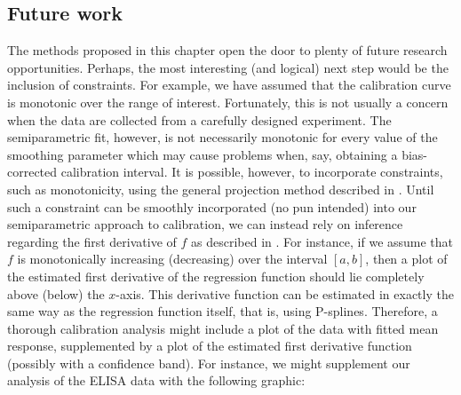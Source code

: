 \documentclass[cmfont,usenames,dvipsnames,leqno]{afit-etd}\usepackage[]{graphicx}\usepackage[]{color}
\begin{document}
\subsection{Future work}
The methods proposed in this chapter open the door to plenty of future research opportunities. Perhaps, the most interesting (and logical) next step would be the inclusion of constraints. For example, we have assumed that the calibration curve is monotonic over the range of interest. Fortunately, this is not usually a concern when the data are collected from a carefully designed experiment. The semiparametric fit, however, is not necessarily monotonic for every value of the smoothing parameter which may cause problems when, say, obtaining a bias-corrected calibration interval. It is possible, however, to incorporate constraints, such as monotonicity, using the general projection method described in \citet{mammen_general_2001}. Until such a constraint can be smoothly incorporated (no pun intended) into our semiparametric approach to calibration, we can instead rely on inference regarding the first derivative of $f$ as described in \citet[pp. 151-156]{ruppert_semiparametric_2003}. For instance, if we assume that $f$ is monotonically increasing (decreasing) over the interval $[a, b]$, then a plot of the estimated first derivative of the regression function should lie completely above (below) the $x$-axis. This derivative function can be estimated in exactly the same way as the regression function itself, that is, using P-splines. Therefore, a thorough calibration analysis might include a plot of the data with fitted mean response, supplemented by a plot of the estimated first derivative function (possibly with a confidence band). For instance, we might supplement our analysis of the ELISA data with the following graphic:
\end{document}

